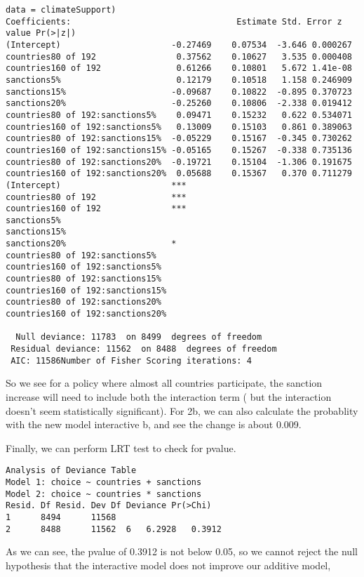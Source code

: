 \documentclass[12pt,letterpaper]{article}
\begin{document}
\begin{enumerate}
\begin{enumerate}
\begin{itemize}
\begin{lstlisting}
data = climateSupport)
Coefficients:                                 Estimate Std. Error z value Pr(>|z|)
(Intercept)                      -0.27469    0.07534  -3.646 0.000267
countries80 of 192                0.37562    0.10627   3.535 0.000408
countries160 of 192               0.61266    0.10801   5.672 1.41e-08
sanctions5%                       0.12179    0.10518   1.158 0.246909
sanctions15%                     -0.09687    0.10822  -0.895 0.370723
sanctions20%                     -0.25260    0.10806  -2.338 0.019412
countries80 of 192:sanctions5%    0.09471    0.15232   0.622 0.534071
countries160 of 192:sanctions5%   0.13009    0.15103   0.861 0.389063
countries80 of 192:sanctions15%  -0.05229    0.15167  -0.345 0.730262
countries160 of 192:sanctions15% -0.05165    0.15267  -0.338 0.735136
countries80 of 192:sanctions20%  -0.19721    0.15104  -1.306 0.191675
countries160 of 192:sanctions20%  0.05688    0.15367   0.370 0.711279                                    (Intercept)                      ***
countries80 of 192               ***
countries160 of 192              ***
sanctions5%                         
sanctions15%                        
sanctions20%                     *  
countries80 of 192:sanctions5%      
countries160 of 192:sanctions5%     
countries80 of 192:sanctions15%     
countries160 of 192:sanctions15%    
countries80 of 192:sanctions20%     
countries160 of 192:sanctions20%   

  Null deviance: 11783  on 8499  degrees of freedom
 Residual deviance: 11562  on 8488  degrees of freedom
 AIC: 11586Number of Fisher Scoring iterations: 4			
\end{lstlisting}
So we see for a policy where almost all countries participate, the sanction increase will need to include both the interaction term ( but the interaction doesn't seem statistically significant). For 2b, we can also calculate the probablity with the new model interactive b, and see the change is about 0.009.
	 
Finally, we can perform  LRT test to check for pvalue.
	 
	\begin{lstlisting}	
Analysis of Deviance Table
Model 1: choice ~ countries + sanctions
Model 2: choice ~ countries * sanctions  
Resid. Df Resid. Dev Df Deviance Pr(>Chi)
1      8494      11568                     
2      8488      11562  6   6.2928   0.3912			
\end{lstlisting}
As we can see, the pvalue of 0.3912 is not below 0.05, so we cannot reject the null hypothesis that the interactive model does not improve our additive model,
		\end{itemize}
	\end{enumerate}
	\end{enumerate}
\end{document}
